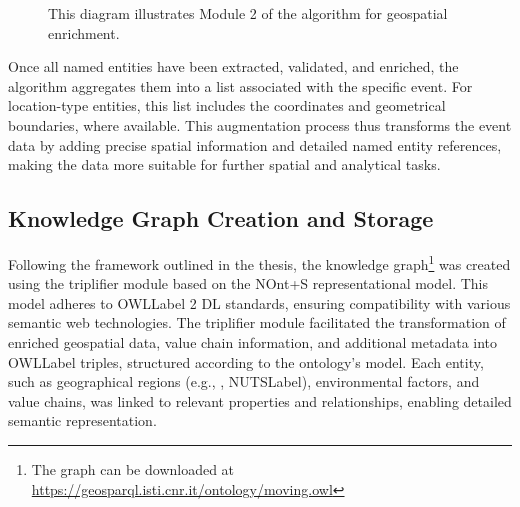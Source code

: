 \begin{figure}
\caption{This diagram illustrates Module 2 of the algorithm for geospatial enrichment.}
\label{fig:alg2}
\end{figure}

Once all named entities have been extracted, validated, and enriched, the algorithm aggregates them into a list associated with the specific event. For location-type entities, this list includes the coordinates and geometrical boundaries, where available. This augmentation process thus transforms the event data by adding precise spatial information and detailed named entity references, making the data more suitable for further spatial and analytical tasks.

\subsection{Knowledge Graph Creation and Storage}\label{VII-subsec:moving-kg}
Following the framework outlined in the thesis, the knowledge graph\footnote{The graph can be downloaded at \url{https://geosparql.isti.cnr.it/ontology/moving.owl}} was created using the triplifier module based on the NOnt+S representational model. This model adheres to \acrshort{OWLLabel} 2 DL \cite{OWLWebOntologyc} standards, ensuring compatibility with various semantic web technologies. The triplifier module facilitated the transformation of enriched geospatial data, value chain information, and additional metadata into \acrshort{OWLLabel} triples, structured according to the ontology’s model. Each entity, such as geographical regions (e.g., , \acrshort{NUTSLabel}), environmental factors, and value chains, was linked to relevant properties and relationships, enabling detailed semantic representation.

